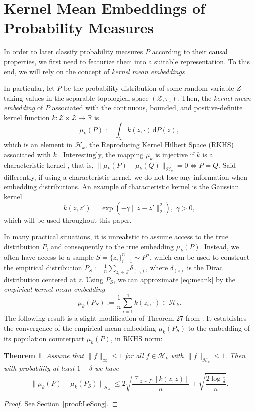 \documentclass{article}
\newtheorem{theorem}{Theorem}
\DeclareMathOperator*{\E}{\mathbb{E}\,}
\renewcommand{\H}{\mathcal{H}}
\newcommand{\Z}{\mathcal{Z}}
\newcommand{\R}{\mathbb{R}}
\renewcommand{\d}{\mathrm{d}}
\begin{document}
\newpage
\section{Kernel Mean Embeddings of Probability Measures}
\label{sec:embeddings}

In order to later classify probability measures $P$ according to their causal
properties, we first need to featurize them into a suitable representation. To
this end, we will rely on the concept of \emph{kernel mean embeddings}
\cite{Smola07Hilbert}.

In particular, let $P$ be the probability distribution of some random variable
$Z$ taking values in the separable topological space $(\Z,\tau_z)$.  Then, the
\emph{kernel mean embedding} of $P$ associated with the continuous, bounded,
and positive-definite kernel function $k : \Z \times \Z \to \R$ is 
\begin{equation}
  \label{eq:meank}
  \mu_k(P) := \int_{\Z} k( z, \cdot) \, \d P(z),
\end{equation}
which is an element in $\H_k$, the Reproducing Kernel Hilbert Space (RKHS) associated with $k$
\cite{Schoelkopf02}.  Interestingly, the mapping $\mu_k$ is injective if $k$ is
a characteristic kernel \citep{Sriperumbudur10:Metrics}, that is,
$\|\mu_k(P)-\mu_k(Q)\|_{\H_k}=0 \Leftrightarrow P=Q$. Said differently, if
using a characteristic kernel, we do not lose any information when embedding
distributions. An example of characteristic kernel is the Gaussian kernel
\begin{equation}\label{eq:gauss}
  k(z,z') = \exp\left(-\gamma \|z-z'\|_2^2\right), \,\, \gamma > 0,
\end{equation}
which will be used throughout this paper.

In many practical situations, it is unrealistic to assume access to the true
distribution $P$, and consequently to the true embedding $\mu_k(P)$.  Instead,
we often have access to a sample $S = \{z_i\}_{i=1}^n \sim P^n$, which can be
used to construct the empirical distribution $P_S := \frac{1}{n} \sum_{z_i\in
S} \delta_{(z_i)}$, where $\delta_{(z)}$ is the Dirac distribution centered at
$z$.  Using $P_S$, we can approximate \eqref{eq:meank} by the \emph{empirical
kernel mean embedding}
\begin{equation}
  \label{eq:meank2} 
  \mu_k(P_S) := \frac{1}{n} \sum_{i=1}^n k( z_i, \cdot) \in \H_k.
\end{equation}
The following result is a slight modification of Theorem 27 from \cite{S06}.
It establishes the convergence of the empirical mean embedding $\mu_k(P_S)$ to
the embedding of its population counterpart $\mu_k(P)$, in RKHS norm:
\begin{theorem}
\label{thm:LeSong}
Assume that $\|f\|_{\infty}\leq 1$ for all $f\in \H_k$ with $\|f\|_{\H_k}\leq
1$.  Then with probability at least $1-\delta$ we have
\[
\|\mu_k(P)-\mu_k(P_S)\|_{\H_k}
\leq
2\sqrt{\frac{\E_{z\sim P}[k(z,z)]}{n}} + \sqrt{\frac{2\log\frac{1}{\delta}}{n}}.
\]
\end{theorem}
\begin{proof}
  See Section~\ref{proof:LeSong}.
\end{proof}
\end{document}
